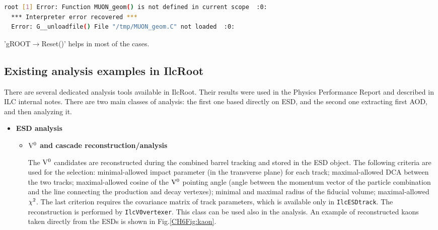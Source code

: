 \documentclass[12pt,a4paper,twoside]{article}
\makeatletter
\newcommand {\ilcroot} {IlcRoot\@\xspace}
\makeatother
\begin{document}
{\begin{enumerate}
\begin{lstlisting}[language=sh]
  root [1] Error: Function MUON_geom() is not defined in current scope  :0:
  *** Interpreter error recovered ***
  Error: G__unloadfile() File "/tmp/MUON_geom.C" not loaded  :0:
\end{lstlisting}

'gROOT$\to$Reset()' helps in most of the cases.
\end{enumerate}


\vspace{-0.2cm}
\subsection{Existing analysis examples in \ilcroot}

There are several dedicated analysis tools available in \ilcroot. Their results
were used in the Physics Performance Report and described in
ILC internal notes. There are two main classes of analysis: the
first one based directly on ESD, and the second one extracting first
AOD, and then analyzing it.

\begin{itemize}
\item\textbf{ESD analysis }

  \begin{itemize}
  \item[ ] \textbf{${\rm V^0}$ and cascade reconstruction/analysis}

    The ${\rm V^0}$ candidates
    are reconstructed during the combined barrel tracking and stored in 
    the ESD object.  The following criteria are used for the selection:
    minimal-allowed impact parameter (in the transverse plane) for each
    track; maximal-allowed DCA between the two tracks;  maximal-allowed
    cosine of the 
    ${\rm V^0}$ pointing angle 
    (angle between the momentum vector of the particle combination
    and the line connecting the production and decay vertexes);  minimal
    and maximal radius of the fiducial volume; maximal-allowed ${\rm
      \chi^2}$. The 
    last criterion requires the covariance matrix of track parameters,
    which is available only in \texttt{IlcESDtrack}. The reconstruction
    is performed by \texttt{IlcV0vertexer}. This class can be used also
    in the analysis. An example of reconstructed kaons taken directly
    from the ESDs is shown in Fig.\ref{CH6Fig:kaon}. 


\end{itemize}
\end{itemize}}
\end{document}
